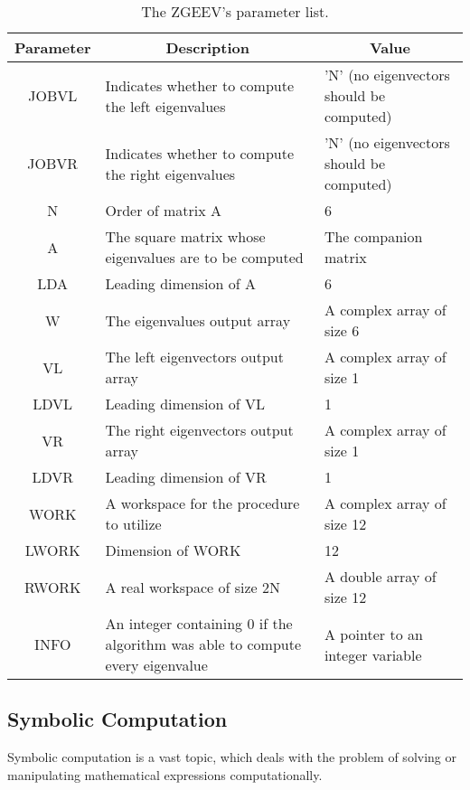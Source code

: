 \begin{table}[H]\label{tab:zgeev}
	\begin{center}
	\begin{tabular}{|c|m{18em}|m{8em}|}
		
		\hline
		\textbf{Parameter} & \multicolumn{1}{|c|}{\textbf{Description}} & \multicolumn{1}{|c|}{\textbf{Value}}\\
		\hline
		JOBVL&  Indicates whether to compute the left eigenvalues&  'N' (no eigenvectors should be computed)\\
		\hline
		JOBVR&  Indicates whether to compute the right eigenvalues&  'N' (no eigenvectors should be computed)\\
		\hline
		N    &  Order of matrix A &  6\\
		\hline
		A    &  The square matrix whose eigenvalues are to be computed & The companion matrix \\
		\hline
		LDA  &  Leading dimension of A & 6 \\
		\hline
		W    &  The eigenvalues output array &  A complex array of size 6\\
		\hline
		VL   &  The left eigenvectors output array & A complex array of size 1 \\
		\hline
		LDVL &  Leading dimension of VL&  1\\
		\hline
		VR   &  The right eigenvectors output array&  A complex array of size 1\\
		\hline
		LDVR &  Leading dimension of VR&  1\\
		\hline
		WORK &  A workspace for the procedure to utilize&  A complex array of size 12\\
		\hline
		LWORK&  Dimension of WORK &  12\\
		\hline
		RWORK&  A real workspace of size 2N &  A double array of size 12\\
		\hline
		INFO &  An integer containing $0$ if the algorithm was able to compute every eigenvalue &  A pointer to an integer variable\\
		\hline
	\end{tabular}
	\end{center}
	\caption{The ZGEEV's parameter list.}
\end{table}

\subsection{Symbolic Computation}

Symbolic computation is a vast topic, which deals with the problem of solving or manipulating mathematical expressions computationally. 

